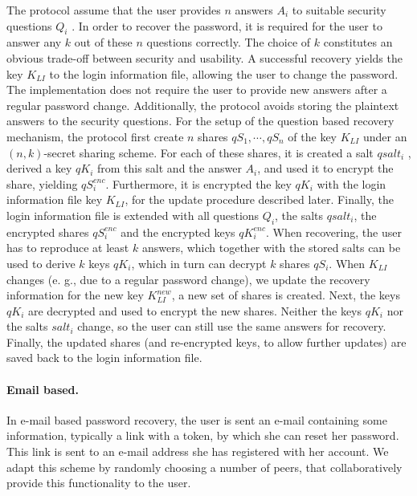  The protocol assume that the user provides $n$ answers $A_i$ to suitable
 security questions $Q_i$ . In order to recover the password, it is
 required for the user to answer any $k$ out of these $n$ questions
 correctly. The choice of $k$ constitutes an obvious trade-off
 between security and usability. A successful recovery yields
 the key $K_{LI}$ to the login information file, allowing the user to
change the password. The implementation
does not require the user to provide new answers after a regular
 password change. Additionally, the protocol avoids storing the plaintext
 answers to the security questions.
 For the setup of the question based recovery mechanism, the protocol first
create $n$ shares $qS_1, \cdots, qS_n$ of the
 key $K_{LI}$ under an $(n, k)$-secret sharing scheme. For each of
 these shares, it is created a salt $qsalt_i$ , derived a key $qK_i$ from
 this salt and the answer $A_i$, and used it to encrypt the share,
 yielding $qS^{enc}_i$. Furthermore, it is encrypted the key $qK_i$ with
 the login information file key $K_{LI}$, for the update procedure
 described later. Finally, the login information file is extended
 with all questions $Q_i$, the salts $qsalt_i$, the encrypted shares
 $qS_i^{enc}$ and the encrypted keys $qK_i^{enc}$. When recovering, the
 user has to reproduce at least $k$ answers, which together with
 the stored salts can be used to derive $k$ keys $qK_i$, which in
 turn can decrypt $k$ shares $qS_i$.
 When $K_{LI}$ changes (e. g., due to a regular password
 change), we update the recovery information %
 for the new key $K_{LI}^{new}$, a new set of shares is created.
 Next, the keys $qK_i$ are decrypted and used to encrypt the new
 shares. Neither the keys $qK_i$ nor the salts $salt_i$ change, so
 the user can still use the same answers for recovery. Finally,
 the updated shares (and re-encrypted keys, to allow further
 updates) are saved back to the login information file.

\paragraph{Email based.}

  In e-mail based password recovery, the user is sent an e-mail
 containing some information, typically a link with a token, by
 which she can reset her password. This link is sent to an e-mail
 address she has registered with her account.
 We adapt this scheme by randomly choosing a number of
 peers, that collaboratively provide this functionality to the user.
 

